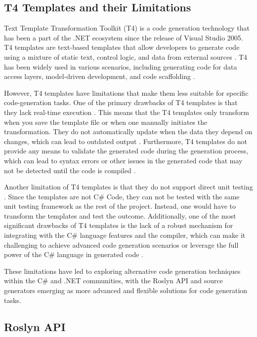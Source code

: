 \subsection{T4 Templates and their Limitations}

Text Template Transformation Toolkit (T4) is a code generation technology that has been a part of the .NET ecosystem since the release of Visual Studio 2005\cite{Klein2010}. T4 templates are text-based templates that allow developers to generate code using a mixture of static text, control logic, and data from external sources \cite{Klein2010}. T4 has been widely used in various scenarios, including generating code for data access layers, model-driven development, and code scaffolding \cite{Vogel2010}.

However, T4 templates have limitations that make them less suitable for specific code-generation tasks. One of the primary drawbacks of T4 templates is that they lack real-time execution \cite{Klein2010}. This means that the T4 templates only transform when you save the template file or when one manually initiates the transformation. They do not automatically update when the data they depend on changes, which can lead to outdated output \cite{Klein2010}. Furthermore, T4 templates do not provide any means to validate the generated code during the generation process, which can lead to syntax errors or other issues in the generated code that may not be detected until the code is compiled \cite{Vogel2010}.

Another limitation of T4 templates is that they do not support direct unit testing \cite{Klein2010}. Since the templates are not C\# Code, they can not be tested with the same unit testing framework as the rest of the project. Instead, one would have to transform the templates and test the outcome. Additionally, one of the most significant drawbacks of T4 templates is the lack of a robust mechanism for integrating with the C\# language features and the compiler, which can make it challenging to achieve advanced code generation scenarios or leverage the full power of the C\# language in generated code \cite{Esposito2014}.

These limitations have led to exploring alternative code generation techniques within the C\# and .NET communities, with the Roslyn API and source generators emerging as more advanced and flexible solutions for code generation tasks.

\subsection{Roslyn API}

